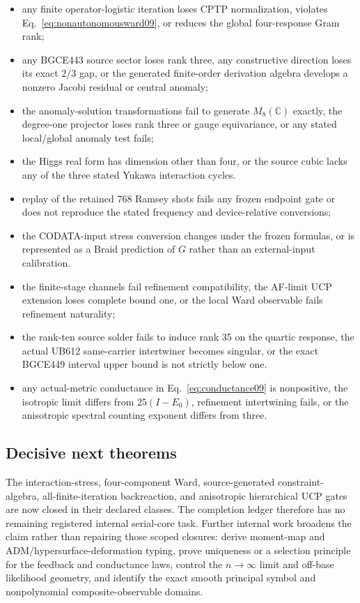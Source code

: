 \documentclass[11pt]{article}
\theoremstyle{definition}
\theoremstyle{remark}
\begin{document}
\begin{itemize}
\item any finite operator-logistic iteration loses CPTP normalization, violates Eq.~\eqref{eq:nonautonomousward09}, or reduces the global four-response Gram rank;
\item any BGCE443 source sector loses rank three, any constructive direction loses its exact $2/3$ gap, or the generated finite-order derivation algebra develops a nonzero Jacobi residual or central anomaly;
\item the anomaly-solution transformations fail to generate $M_8(\mathbb C)$ exactly, the degree-one projector loses rank three or gauge equivariance, or any stated local/global anomaly test fails;
\item the Higgs real form has dimension other than four, or the source cubic lacks any of the three stated Yukawa interaction cycles.
\item replay of the retained 768 Ramsey shots fails any frozen endpoint gate or does not reproduce the stated frequency and device-relative conversions;
\item the CODATA-input stress conversion changes under the frozen formulas, or is represented as a Braid prediction of $G$ rather than an external-input calibration.
\item the finite-stage channels fail refinement compatibility, the AF-limit UCP extension loses complete bound one, or the local Ward observable fails refinement naturality;
\item the rank-ten source solder fails to induce rank 35 on the quartic response, the actual UB612 same-carrier intertwiner becomes singular, or the exact BGCE449 interval upper bound is not strictly below one.
\item any actual-metric conductance in Eq.~\eqref{eq:conductance09} is nonpositive, the isotropic limit differs from $25(I-E_0)$, refinement intertwining fails, or the anisotropic spectral counting exponent differs from three.
\end{itemize}

\subsection{Decisive next theorems}

The interaction-stress, four-component Ward, source-generated constraint-algebra, all-finite-iteration backreaction, and anisotropic hierarchical UCP gates are now closed in their declared classes. The completion ledger therefore has no remaining registered internal serial-core task. Further internal work broadens the claim rather than repairing those scoped closures: derive moment-map and ADM/hypersurface-deformation typing, prove uniqueness or a selection principle for the feedback and conductance laws, control the $n\to\infty$ limit and off-base likelihood geometry, and identify the exact smooth principal symbol and nonpolynomial composite-observable domains.
\end{document}
